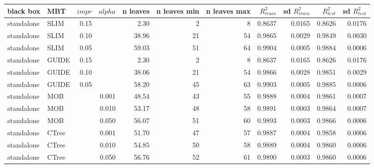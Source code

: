 \begin{table}[!htb]

\centering \tiny
\begin{tabular}[t]{l|l|r|r|r|r|r|r|r|r|r}
\hline
black box & MBT & $impr$ & $alpha$ & n leaves & n leaves min & n leaves max &  $R^2_{train}$ & sd $R^2_{train}$ & $R^2_{test}$ & sd $R^2_{test}$\\
\hline
standalone & SLIM & 0.15 & & 2.30 & 2 & 8 & 0.8637 & 0.0165 & 0.8626 & 0.0176\\
standalone & SLIM & 0.10 & & 38.96 & 21 & 54 & 0.9865 & 0.0029 & 0.9849 & 0.0030\\
standalone & SLIM & 0.05 & & 59.03 & 51 & 64 & 0.9904 & 0.0005 & 0.9884 & 0.0006\\
standalone & GUIDE & 0.15 & & 2.30 & 2 & 8 & 0.8637 & 0.0165 & 0.8626 & 0.0176\\
standalone & GUIDE & 0.10 & & 38.06 & 21 & 54 & 0.9866 & 0.0028 & 0.9851 & 0.0029\\
standalone & GUIDE & 0.05 & & 58.20 & 45 & 63 & 0.9903 & 0.0005 & 0.9885 & 0.0006\\
standalone & MOB & & 0.001 & 48.54 & 43 & 55 & 0.9888 & 0.0004 & 0.9861 & 0.0007\\
standalone & MOB & & 0.010 & 53.17 & 48 & 58 & 0.9891 & 0.0003 & 0.9864 & 0.0007\\
standalone & MOB & & 0.050 & 56.07 & 51 & 60 & 0.9893 & 0.0003 & 0.9866 & 0.0006\\
standalone & CTree & & 0.001 & 51.70 & 47 & 57 & 0.9887 & 0.0004 & 0.9858 & 0.0006\\
standalone & CTree & & 0.010 & 54.85 & 50 & 58 & 0.9889 & 0.0004 & 0.9860 & 0.0006\\
standalone & CTree & & 0.050 & 56.76 & 52 & 61 & 0.9890 & 0.0003 & 0.9860 & 0.0006\\


\end{tabular}
\end{table}
